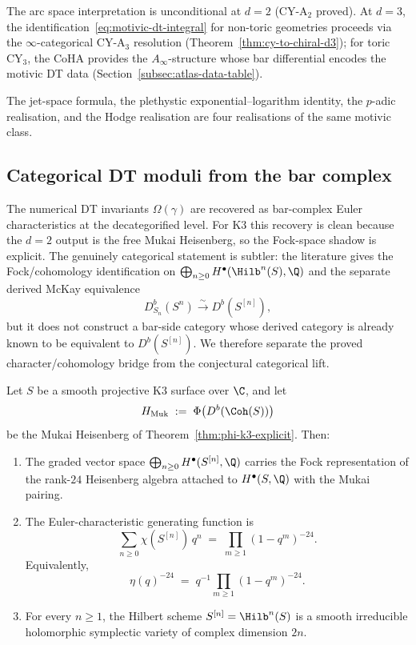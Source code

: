 \begin{remark}
The arc space interpretation is unconditional at $d = 2$ (CY-A$_2$ proved). At $d = 3$, the identification~\eqref{eq:motivic-dt-integral} for non-toric geometries proceeds via the $\infty$-categorical CY-A$_3$ resolution (Theorem~\ref{thm:cy-to-chiral-d3}); for toric CY$_3$, the CoHA provides the $A_\infty$-structure whose bar differential encodes the motivic DT data (Section~\ref{subsec:atlas-data-table}).

The jet-space formula, the plethystic exponential--logarithm identity,
the \(p\)-adic realisation, and the Hodge realisation are four
realisations of the same motivic class.
\end{remark}


\subsection{Categorical DT moduli from the bar complex}
\label{subsec:categorical-dt-bar}

The numerical DT invariants $\Omega(\gamma)$ are recovered as bar-complex Euler characteristics at the decategorified level. For K3 this recovery is clean because the $d=2$ output is the free Mukai Heisenberg, so the Fock-space shadow is explicit. The genuinely categorical statement is subtler: the literature gives the Fock/cohomology identification on $\bigoplus_{n \ge 0} H^\bullet(\Hilb^n(S),\Q)$ and the separate derived McKay equivalence
\[
 D^b_{S_n}(S^n) \xrightarrow{\sim} D^b(S^{[n]}),
\]
but it does not construct a bar-side category whose derived category is already known to be equivalent to $D^b(S^{[n]})$. We therefore separate the proved character/cohomology bridge from the conjectural categorical lift.

\begin{proposition}
\label{prop:mukai-hilbert-fock-bridge}
Let $S$ be a smooth projective K3 surface over $\C$, and let
\[
 H_{\mathrm{Muk}} \;:=\; \Phi\bigl(D^b(\Coh(S))\bigr)
\]
be the Mukai Heisenberg of Theorem~\textup{\ref{thm:phi-k3-explicit}}. Then:
\begin{enumerate}[label=\textup{(\roman*)}]
 \item The graded vector space $\bigoplus_{n \ge 0} H^\bullet(S^{[n]}, \Q)$ carries the Fock representation of the rank-$24$ Heisenberg algebra attached to $H^\bullet(S,\Q)$ with the Mukai pairing.
 \item The Euler-characteristic generating function is
 \[
 \sum_{n \ge 0} \chi(S^{[n]})\, q^n \;=\; \prod_{m \ge 1} (1-q^m)^{-24}.
 \]
 Equivalently,
 \[
 \eta(q)^{-24} \;=\; q^{-1}\prod_{m \ge 1}(1-q^m)^{-24}.
 \]
 \item For every $n \ge 1$, the Hilbert scheme $S^{[n]} = \Hilb^n(S)$ is a smooth irreducible holomorphic symplectic variety of complex dimension $2n$.
\end{enumerate}
\end{proposition}

